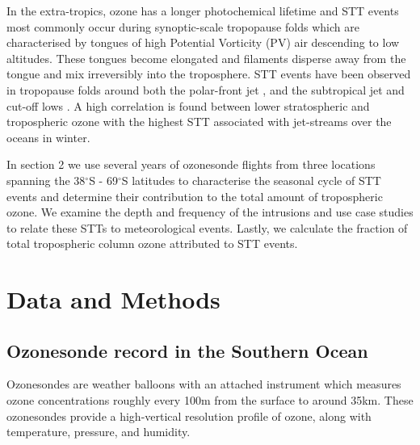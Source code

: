 \documentclass{article}
\begin{document}
    In the extra-tropics, ozone has a longer photochemical lifetime and STT events most commonly occur during synoptic-scale tropopause folds \citep{Sprenger2003, Tang2012} which are characterised by tongues of high Potential Vorticity (PV) air descending to low altitudes. These tongues become elongated and filaments disperse away from the tongue and mix irreversibly into the troposphere. STT events have been observed in tropopause folds around both the polar-front jet \citep{Vaughan1994, Beekmann1997}, and the subtropical jet \citep{Baray2000} and cut-off lows \citep{Price1993, Wirth1995}.  A high correlation is found between lower stratospheric and tropospheric ozone \citep{Terao2008} with the highest STT associated with jet-streams over the oceans in winter.
  


    In section 2 we use several years of ozonesonde flights from three locations spanning the 38$^{\circ}$S - 69$^{\circ}$S latitudes to characterise the seasonal cycle of STT events and determine their contribution to the total amount of tropospheric ozone.
    We examine the depth and frequency of the intrusions and use case studies to relate these STTs to meteorological events.
    Lastly, we calculate the fraction of total tropospheric column ozone attributed to STT events.

\section{Data and Methods}

  \subsection{Ozonesonde record in the Southern Ocean}
    Ozonesondes are weather balloons with an attached instrument which measures ozone concentrations roughly every 100m from the surface to around 35km.
    These ozonesondes provide a high-vertical resolution profile of ozone, along with temperature, pressure, and humidity.
    
\end{document}
